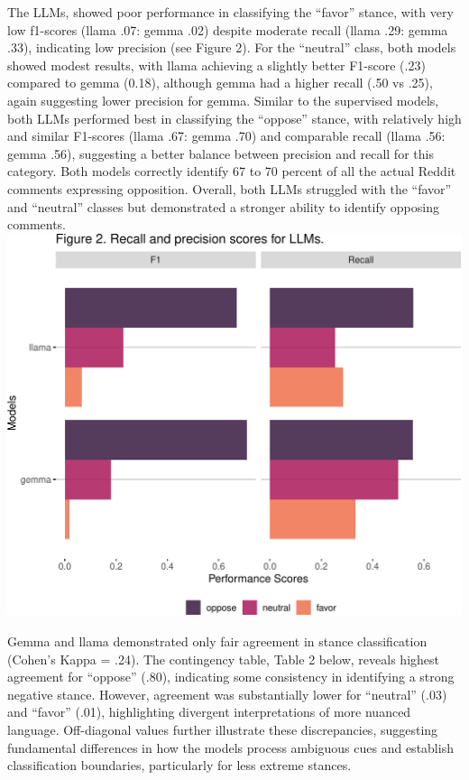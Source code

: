 \documentclass[
  12pt]{article}
\begin{document}
The LLMs, showed poor performance in classifying the ``favor'' stance,
with very low f1-scores (llama .07: gemma .02) despite moderate recall
(llama .29: gemma .33), indicating low precision (see Figure 2). For the
``neutral'' class, both models showed modest results, with llama
achieving a slightly better F1-score (.23) compared to gemma (0.18),
although gemma had a higher recall (.50 vs .25), again suggesting lower
precision for gemma. Similar to the supervised models, both LLMs
performed best in classifying the ``oppose'' stance, with relatively
high and similar F1-scores (llama .67: gemma .70) and comparable recall
(llama .56: gemma .56), suggesting a better balance between precision
and recall for this category. Both models correctly identify 67 to 70
percent of all the actual Reddit comments expressing opposition.
Overall, both LLMs struggled with the ``favor'' and ``neutral'' classes
but demonstrated a stronger ability to identify opposing comments.\\

\includegraphics{assign_3_files/figure-pdf/unnamed-chunk-5-1.pdf}

Gemma and llama demonstrated only fair agreement in stance
classification (Cohen's Kappa = .24). The contingency table, Table 2
below, reveals highest agreement for ``oppose'' (.80), indicating some
consistency in identifying a strong negative stance. However, agreement
was substantially lower for ``neutral'' (.03) and ``favor'' (.01),
highlighting divergent interpretations of more nuanced language.
Off-diagonal values further illustrate these discrepancies, suggesting
fundamental differences in how the models process ambiguous cues and
establish classification boundaries, particularly for less extreme
stances.
\end{document}
